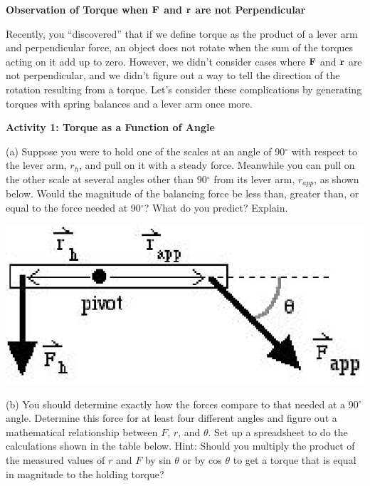 \textbf{Observation of Torque when \( {\bf F} \) and \( {\bf r} \)
are not Perpendicular} 

Recently, you ``discovered'' that if we define torque as the
product of a lever arm and perpendicular force, an object does not rotate when
the sum of the torques acting on it add up to zero. However, we didn't consider
cases where \textbf{\( {\bf F} \)} and \textbf{\( {\bf r} \)}
are not perpendicular, and we didn't figure out a way to tell the direction
of the rotation resulting from a torque. Let's consider these complications
by generating torques with spring balances and a lever arm once more. 

\textbf{Activity 1: Torque as a Function of Angle} 

(a) Suppose you were to hold one of the scales at an angle of 90\( ^{\circ } \)
with respect to the lever arm, \( r_{h} \), and pull on it with a steady force.
Meanwhile you can pull on the other scale at several angles other than 90\( ^{\circ } \)
from its lever arm, \( r_{app} \), as shown below. Would the magnitude of the
balancing force be less than, greater than, or equal to the force needed at
90\( ^{\circ } \)? What do you predict? Explain.

\vspace{0.3cm}
{\par\raggedright \includegraphics{ang_mom_fig1.eps} \par}
\vspace{0.3cm}

(b) You should determine exactly how the forces compare to that needed at a
90\( ^{\circ } \) angle. Determine this force for at least four different angles
and figure out a mathematical relationship between $F$, $r$, and \( \theta  \).
Set up a spreadsheet to do the calculations shown in the table below. Hint:
Should you multiply the product of the measured values of $r$ and $F$ 
by sin \( \theta  \)
or by cos \( \theta  \) to get a torque that is equal in magnitude to the holding
torque?

